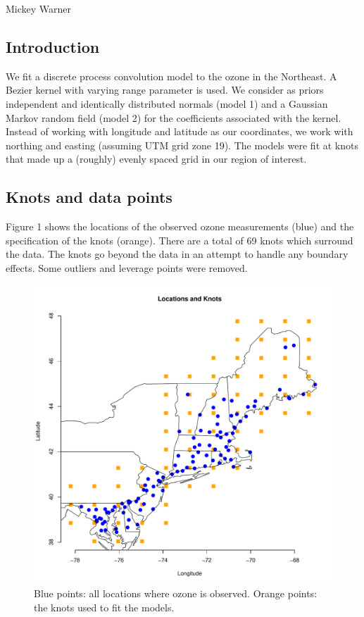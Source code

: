 \documentclass[12pt]{article}
\begin{document}
Mickey Warner
\bigskip

\subsection*{Introduction}

We fit a discrete process convolution model to the ozone in the Northeast. A Bezier kernel with varying range parameter is used. We consider as priors independent and identically distributed normals (model 1) and a Gaussian Markov random field (model 2) for the coefficients associated with the kernel. Instead of working with longitude and latitude as our coordinates, we work with northing and easting (assuming UTM grid zone 19). The models were fit at knots that made up a (roughly) evenly spaced grid in our region of interest.

\subsection*{Knots and data points}
Figure 1 shows the locations of the observed ozone measurements (blue) and the specification of the knots (orange). There are a total of 69 knots which surround the data. The knots go beyond the data in an attempt to handle any boundary effects. Some outliers and leverage points were removed.

\begin{figure}[ht]
\begin{center}
\includegraphics[scale=0.5]{figs/knots.pdf}
\end{center}
\caption{Blue points: all locations where ozone is observed. Orange points: the knots used to fit the models.}
\end{figure}
\end{document}
